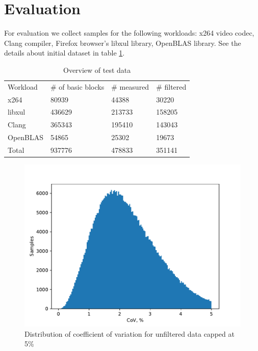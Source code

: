 \section{Evaluation}

For evaluation we collect samples for the following workloads: x264 video codec, Clang compiler, Firefox browser's libxul library, OpenBLAS library.
See the details about initial dataset in table \ref{tab:test_data}.

\begin{table}[h]
  \label{tab:test_data}
  \caption{Overview of test data}
  \begin{tabular}{llll}
  Workload & \# of basic blocks & \# measured & \# filtered \\
  x264     & 80939              & 44388       & 30220       \\
  libxul   & 436629             & 213733      & 158205      \\
  Clang    & 365343             & 195410      & 143043      \\
  OpenBLAS & 54865              & 25302       & 19673       \\
  Total    & 937776             & 478833      & 351141
  \end{tabular}
\end{table}

\begin{figure}[h]
  \caption{Distribution of coefficient of variation for unfiltered data capped at 5\%}
  \centering
  \includegraphics[width=0.9\columnwidth]{cov_distribution_zoom}
\end{figure}

